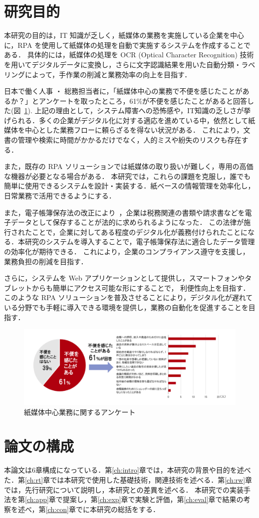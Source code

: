 \section{研究目的}
\label{sec:research_purpose}

本研究の目的は，IT 知識が乏しく，紙媒体の業務を実施している企業を中心に，RPA を使用して紙媒体の処理を自動で実施するシステムを作成することである．
具体的には，紙媒体の処理を OCR (Optical Character Recognition) 技術を用いてデジタルデータに変換し，さらに文字認識結果を用いた自動分類・ラベリングによって，手作業の削減と業務効率の向上を目指す．

日本で働く人事 ・ 総務担当者に，「紙媒体中心の業務で不便を感じたことがあるか？」とアンケートを取ったところ，61\%が不便を感じたことがあると回答した(図~\ref{fig:paper_media_survey}).
上記の理由として，システム障害への恐怖感や，IT知識の乏しさが挙げられる．多くの企業がデジタル化に対する適応を進めている中，依然として紙媒体を中心とした業務フローに頼らざるを得ない状況がある．
これにより，文書の管理や検索に時間がかかるだけでなく，人的ミスや紛失のリスクも存在する．

また，既存の RPA ソリューションでは紙媒体の取り扱いが難しく，専用の高価な機器が必要となる場合がある．
本研究では，これらの課題を克服し，誰でも簡単に使用できるシステムを設計・実装する．紙ベースの情報管理を効率化し，日常業務で活用できるようにする．

また，電子帳簿保存法の改正により~\cite{ito2023}，企業は税務関連の書類や請求書などを電子データとして保存することが法的に求められるようになった．
この法律が施行されたことで，企業に対してある程度のデジタル化が義務付けられたことになる．本研究のシステムを導入することで，電子帳簿保存法に適合したデータ管理の効率化が期待できる．
これにより，企業のコンプライアンス遵守を支援し，業務負担の削減を目指す．

さらに，システムを Web アプリケーションとして提供し，スマートフォンやタブレットからも簡単にアクセス可能な形にすることで，
利便性向上を目指す．このような RPA ソリューションを普及させることにより，デジタル化が遅れている分野でも手軽に導入できる環境を提供し，業務の自動化を促進することを目指す．

\begin{figure}[htbp]
  \vspace{1cm}
  \centering
  \includegraphics[scale = 0.6]{img/paper_media_survey.pdf}
  \caption{紙媒体中心業務に関するアンケート}
  \label{fig:paper_media_survey}
\end{figure}%

\section{論文の構成}
\label{sec_str}

本論文は6章構成になっている．第\ref{ch:intro}章では，本研究の背景や目的を述べた．第\ref{ch:rt}章では本研究で使用した基礎技術，関連技術を述べる．第\ref{ch:rw}章では，先行研究について説明し，本研究との差異を述べる．
本研究での実装手法を第\ref{ch:app}章で提案し，第\ref{ch:exp}章で実験と評価，第\ref{ch:eval}章で結果の考察を述べ，第\ref{ch:con}章でに本研究の総括をする．
